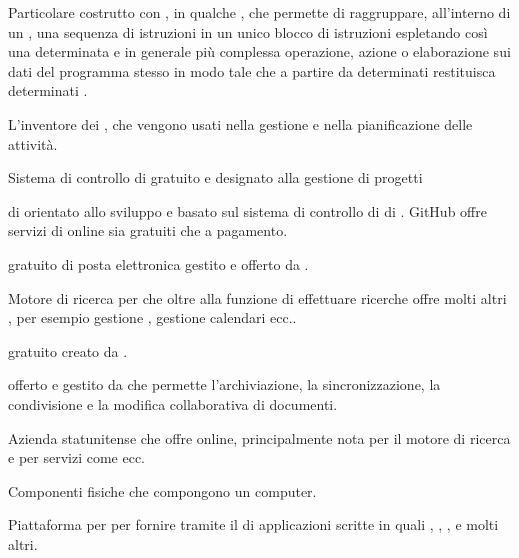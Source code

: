 {Particolare costrutto con , in qualche , che permette di raggruppare, all'interno di un , una sequenza di istruzioni in un unico blocco di istruzioni espletando così una determinata e in generale più complessa operazione, azione o elaborazione sui dati del programma stesso in modo tale che a partire da determinati  restituisca determinati .}




{L'inventore dei , che vengono usati nella gestione e nella pianificazione delle attività.}

{Sistema di controllo di   gratuito e  designato alla gestione di progetti }

{ di   orientato allo sviluppo  e basato sul sistema di controllo di  di . GitHub offre servizi di  online sia gratuiti che a pagamento.}

{ gratuito di posta elettronica gestito e offerto da .}

{Motore di ricerca per  che oltre alla funzione di effettuare ricerche offre molti altri , per esempio gestione , gestione calendari ecc..} 

{ gratuito creato da .}

{ offerto e gestito da  che permette l'archiviazione, la sincronizzazione, la condivisione e la modifica collaborativa di documenti.}

{Azienda statunitense che offre  online, principalmente nota per il motore di ricerca  e per servizi come  ecc.}




{Componenti fisiche che compongono un computer.}

{Piattaforma  per per fornire  tramite il  di applicazioni scritte in  quali , , , e molti altri.}

